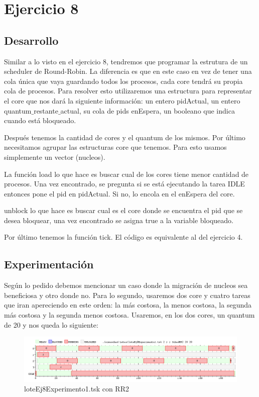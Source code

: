 \section{Ejercicio 8}


\subsection{Desarrollo}
Similar  a lo visto en el ejercicio 8, tendremos que programar la estrutura de un scheduler de Round-Robin. La diferencia es que en este caso en vez de tener una cola única que vaya guardando todos los procesos, cada core tendrá su propia cola de procesos. Para resolver esto utilizaremos una estructura para representar el core que nos dará la siguiente información: un entero pidActual, un entero quantum$\_$restante$\_$actual, su cola de pids enEspera, un booleano que indica cuando está bloqueado.

Después tenemos la cantidad de cores y el quantum de los mismos. Por último necesitamos agrupar las estructuras core que tenemos. Para esto usamos simplemente un vector (nucleos).

La función load lo que hace es buscar cual de los cores tiene menor cantidad de procesos. Una vez encontrado, se pregunta si se está ejecutando la tarea IDLE entonces pone el pid en pidActual. Si no, lo encola en el enEspera del core.

unblock lo que hace es buscar cual es el core donde se encuentra el pid que se desea bloquear, una vez encontrado se asigna true a la variable bloqueado.

Por último tenemos la función tick. El código es equivalente al del ejercicio 4.


\subsection{Experimentación}
Según lo pedido debemos mencionar un caso donde la migración de nucleos sea beneficiosa y otro donde no. Para lo segundo, usaremos dos core y cuatro tareas que iran apereciendo
en este orden: la más costosa,  la menos costosa, la segunda más costosa y la segunda menos costosa. Usaremos, en los dos cores, un quantum de 20 y nos queda lo siguiente:

\begin{figure}[H]
  \centering
    \includegraphics[width=1.1\textwidth]{imagenes/Ej8Experimento1.png}
  \caption{loteEj8Experimento1.tsk con RR2}
\end{figure}

